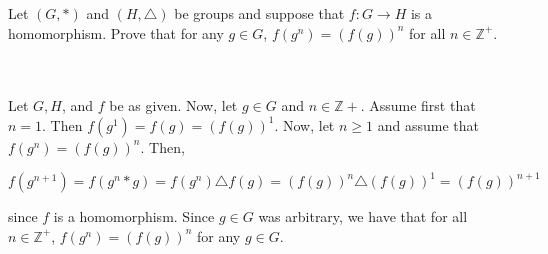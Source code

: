 Let $(G,*)$ and $(H,\triangle)$ be groups and suppose that $f:G\rightarrow H$ is a homomorphism. Prove
that for any $g\in G$, $f(g^n)=(f(g))^n$ for all $n\in\mathbb{Z}^+$.\\\\

\begin{solution}\renewcommand{\qedsymbol}{}\ \\
    Let $G, H$, and $f$ be as given. Now, let $g\in G$ and $n\in\mathbb{Z}+$. Assume first that $n=1$.
    Then $f(g^1)=f(g)=(f(g))^1$. Now, let $n\geq1$ and assume that $f(g^n)=(f(g))^n$. Then,
    
    $$f(g^{n+1})=f(g^n*g)=f(g^n)\triangle f(g)=(f(g))^n\triangle (f(g))^1=(f(g))^{n+1}$$
    
    since $f$ is a homomorphism. Since $g\in G$ was arbitrary, we have that for all $n\in\mathbb{Z}^+$,
    $f(g^n)=(f(g))^n$ for any $g\in G$.

\end{solution}